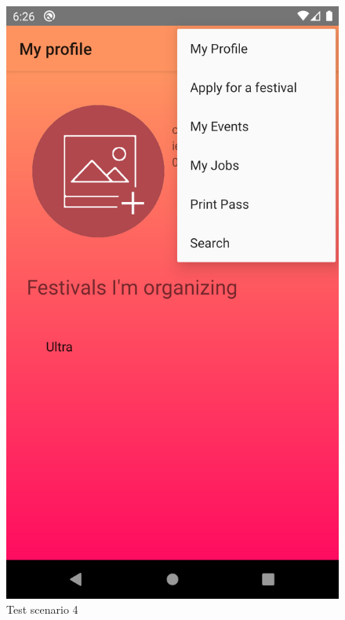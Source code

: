 			\begin{figure}[H]
				\includegraphics[width=\linewidth]{images/test_Screens/test_scenario_4-2.png}
				\caption{Test scenario 4}
				\label{fig:espresso_4_2}
			\end{figure}
			

